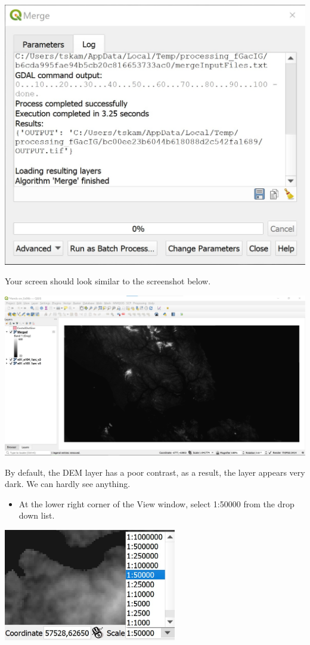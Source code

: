 \documentclass[
  letterpaper,
  DIV=11,
  numbers=noendperiod]{scrreprt}
\providecommand{\tightlist}{%
  \setlength{\itemsep}{0pt}\setlength{\parskip}{0pt}}\usepackage{longtable,booktabs,array}
\begin{document}
\includegraphics{./img06/image41.jpg}

Your screen should look similar to the screenshot below.

\includegraphics{./img06/image42.jpg}

By default, the DEM layer has a poor contrast, as a result, the layer
appears very dark. We can hardly see anything.

\begin{itemize}
\tightlist
\item
  At the lower right corner of the View window, select 1:50000 from the
  drop down list.
\end{itemize}

\includegraphics[width=2.96875in,height=\textheight]{./img06/image43.jpg}
\end{document}
